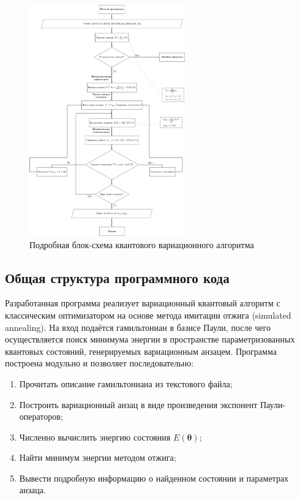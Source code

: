 \documentclass[a4paper]{report}
\begin{document}
\begin{figure}[ht]
\centering
\includegraphics[width=0.6\textwidth]{figures/scheme.pdf}
\caption{Подробная блок-схема квантового вариационного алгоритма}
\label{DetailedQuantumVariationAlgorithmScheme}
\end{figure}


\subsection{Общая структура программного кода}

Разработанная программа реализует вариационный квантовый алгоритм с классическим оптимизатором на основе метода имитации отжига (simulated annealing). На вход подаётся гамильтониан в базисе Паули, после чего осуществляется поиск минимума энергии в пространстве параметризованных квантовых состояний, генерируемых вариационным анзацем. Программа построена модульно и позволяет последовательно:

\begin{enumerate}
    \item Прочитать описание гамильтониана из текстового файла;
    \item Построить вариационный анзац в виде произведения экспонент Паули-операторов;
    \item Численно вычислить энергию состояния $E(\bm\theta)$;
    \item Найти минимум энергии методом отжига;
    \item Вывести подробную информацию о найденном состоянии и параметрах анзаца.
\end{enumerate}
\end{document}
